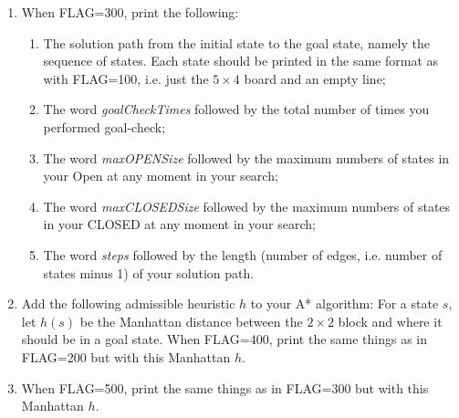 \documentclass[10pt,a4paper]{article}
\begin{document}
\begin{enumerate}
\item When FLAG=300, print the following:
\begin{enumerate}
\item The solution path from the initial state to the goal state, namely the sequence of states. Each state should be printed in the same format as with FLAG=100, i.e. just the $5\times4$ board and an empty line;
\item The word \emph{goalCheckTimes} followed by the total number of times you performed goal-check;
\item The word \emph{maxOPENSize} followed by the maximum numbers of states in your Open at any moment in your search;
\item The word \emph{maxCLOSEDSize} followed by the maximum numbers of states in your CLOSED at any moment in your search;
\item The word \emph{steps} followed by the length (number of edges, i.e. number of states minus 1) of your solution path.
\end{enumerate}

\item Add the following admissible heuristic $h$ to your A* algorithm:
For a state $s$, let $h(s)$ be the Manhattan distance between the $2\times2$ block and where it should be in a goal state.
When FLAG=400, print the same things as in FLAG=200 but with this Manhattan $h$.

\item
When FLAG=500, print the same things as in FLAG=300 but with this Manhattan $h$.



\end{enumerate}
\end{document}
